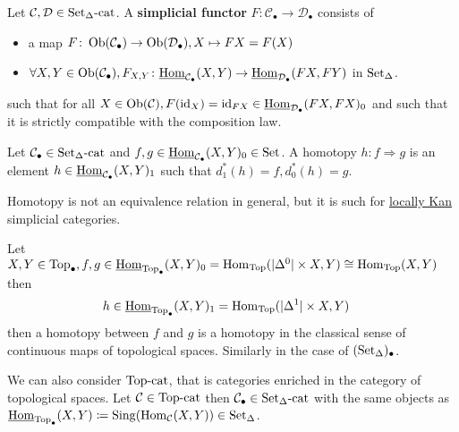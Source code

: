 \begin{defi}
	Let $ \mathcal{ C } , \mathcal{ D } \in \operatorname{Set_{ \Delta }-cat} $. A \textbf{simplicial functor} $ F \colon \mathcal{ C }_\bullet \to \mathcal{ D }_\bullet $ consists of 
	\begin{itemize}
		\item 	
		a map $ F \colon \operatorname{Ob}( \mathcal{ C }_\bullet ) \to \operatorname{Ob} ( \mathcal{ D }_\bullet ) , X \mapsto FX = F ( X ) $
		
		\item 
		$ \forall X , Y \in \operatorname{Ob}( \mathcal{ C }_\bullet ), F_{ X , Y } \colon \underline{ \operatorname{Hom} }_{ \mathcal{ C }_\bullet} ( X , Y ) \to \underline{ \operatorname{Hom} }_{ \mathcal{ D }_\bullet} ( FX , FY ) $ in $ \operatorname{Set}_{\Delta} $.
	\end{itemize}
 	such that for all $ X \in \operatorname{Ob} ( \mathcal{ C } ), F ( \operatorname{id}_X ) = \operatorname{id}_{ FX } \in \underline{ \operatorname{Hom} }_{ \mathcal{ D }_\bullet } ( F X , F X )_0 $ and such that it is strictly compatible with the composition law.
\end{defi}

\begin{defi}
	Let $ \mathcal{ C }_\bullet \in \operatorname{Set_{ \Delta }-cat} $ and $ f ,g \in \underline{ \operatorname{Hom} }_{ \mathcal{ C }_\bullet} ( X , Y )_0 \in \operatorname{Set} $.
	A homotopy $ h \colon f \Rightarrow g $ is an element $ h \in \operatorname{\underline{Hom}}_{\mathcal{ C }_\bullet} ( X , Y )_1 $ such that $ d_1^* ( h ) = f , d_0^* ( h ) = g $.
\end{defi}

\begin{Warning}
	Homotopy is not an equivalence relation in general, but it is such for \underline{locally Kan} simplicial categories.
\end{Warning}

\begin{exmp}
	Let $ X , Y \in \operatorname{Top}_\bullet , f ,g \in \operatorname{\underline{Hom}}_{ \operatorname{Top}_\bullet } ( X , Y )_0 = \operatorname{Hom}_{ \operatorname{Top} } ( \lvert \Delta^0 \rvert \times X , Y ) \cong \operatorname{Hom}_{ \operatorname{Top} } ( X , Y ) $ then
	\begin{align*}
		h \in \operatorname{\underline{Hom}}_{ \operatorname{Top}_\bullet } ( X , Y )_1 
		&=
		\operatorname{Hom}_{ \operatorname{Top} } ( \lvert \Delta^1 \rvert \times X , Y )
	\end{align*}
	then a homotopy between $ f $ and $ g $ is a homotopy in the classical sense of continuous maps of topological spaces.
	Similarly in the case of $ ( \operatorname{Set}_{\Delta} )_\bullet $.
\end{exmp}

\begin{rmk}
	We can also consider $ \operatorname{Top-cat} $, that is categories enriched in the category of topological spaces.
	Let $ \mathcal{ C } \in \operatorname{Top-cat} $ then $ \mathcal{ C }_\bullet \in \operatorname{Set_{ \Delta }-cat} $ with the same objects as $ \operatorname{\underline{Hom}}_{ \operatorname{Top}_\bullet } ( X , Y ) \coloneqq \operatorname{Sing} ( \operatorname{Hom}_{ \mathcal{ C } } ( X , Y ) ) \in \operatorname{Set}_{\Delta} $.
\end{rmk}

